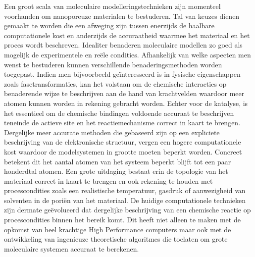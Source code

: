 \npar
Een groot scala van moleculaire modelleringstechnieken zijn momenteel voorhanden om nanoporeuze materialen te bestuderen. Tal van keuzes dienen gemaakt te worden die een afweging zijn tussen enerzijds de haalbare computationele kost en anderzijds de accuraatheid waarmee het materiaal en het proces wordt beschreven. Idealiter benaderen moleculaire modellen zo goed als mogelijk de experimentele en reële condities. Afhankelijk van welke aspecten men wenst te bestuderen kunnen verschillende benaderingsmethoden worden toegepast. Indien men bijvoorbeeld geïnteresseerd is in fysische eigenschappen zoals fasetransformaties, kan het volstaan om de chemische interacties op benaderende wijze te beschrijven aan de hand van krachtvelden waardoor meer atomen kunnen worden in rekening gebracht worden. Echter voor de katalyse, is het essentieel om de chemische bindingen voldoende accuraat te beschrijven teneinde de actieve site en het reactiemechanisme correct in kaart te brengen. Dergelijke meer accurate methoden die gebaseerd zijn op een expliciete beschrijving van de elektronische structuur, vergen een hogere computationele kost waardoor de modelsystemen in grootte moeten beperkt worden. Concreet betekent dit het aantal atomen van het systeem beperkt blijft tot een paar honderdtal atomen. Een grote uitdaging bestaat erin de topologie van het materiaal correct in kaart te brengen en ook rekening te houden met procescondities zoals een realistische temperatuur, gasdruk of aanwezigheid van solventen in de poriën van het materiaal. De huidige computationele technieken zijn dermate geëvolueerd dat dergelijke beschrijving van een chemische reactie op procescondities binnen het bereik komt. Dit heeft niet alleen te maken met de opkomst van heel krachtige High Performance computers maar ook met de ontwikkeling van ingenieuze theoretische algoritmes die toelaten om grote moleculaire systemen accuraat te berekenen. 
\npar

